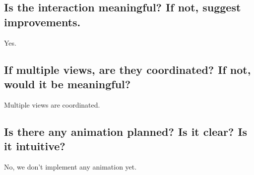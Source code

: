 \documentclass{article}
\begin{document}
    \subsection{Is the interaction meaningful? If not, suggest improvements.}

    Yes.

    \subsection{If multiple views, are they coordinated? If not, would it be meaningful?}

    Multiple views are coordinated.

    \subsection{Is there any animation planned? Is it clear? Is it intuitive?}

    No, we don't implement any animation yet.
\end{document}
